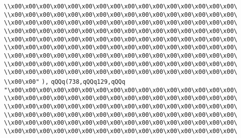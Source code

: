 \verb|\\x00\x00\x00\x00\x00\x00\x00\x00\x00\x00\x00\x00\x00\x00\x00\x00\|\newline
\verb|\\x00\x00\x00\x00\x00\x00\x00\x00\x00\x00\x00\x00\x00\x00\x00\x00\|\newline
\verb|\\x00\x00\x00\x00\x00\x00\x00\x00\x00\x00\x00\x00\x00\x00\x00\x00\|\newline
\verb|\\x00\x00\x00\x00\x00\x00\x00\x00\x00\x00\x00\x00\x00\x00\x00\x00\|\newline
\verb|\\x00\x00\x00\x00\x00\x00\x00\x00\x00\x00\x00\x00\x00\x00\x00\x00\|\newline
\verb|\\x00\x00\x00\x00\x00\x00\x00\x00\x00\x00\x00\x00\x00\x00\x00\x00\|\newline
\verb|\\x00\x00\x00\x00\x00\x00\x00\x00\x00\x00\x00\x00\x00\x00\x00\x00\|\newline
\verb|\\x00\x00\x00\x00\x00\x00\x00\x00\x00\x00\x00\x00\x00\x00\x00\x00\|\newline
\verb|\\x00\x00\x00\x00\x00\x00\x00\x00\x00\x00\x00\x00\x00\x00\x00\x00\|\newline
\verb|\\x00\x00"|\newline
\verb|),|\newline
\verb|qQQq(738,qQQq129,qQQq|\newline
\verb|"\x00\x00\x00\x00\x00\x00\x00\x00\x00\x00\x00\x00\x00\x00\x00\x00\|\newline
\verb|\\x00\x00\x00\x00\x00\x00\x00\x00\x00\x00\x00\x00\x00\x00\x00\x00\|\newline
\verb|\\x00\x00\x00\x00\x00\x00\x00\x00\x00\x00\x00\x00\x00\x00\x00\x00\|\newline
\verb|\\x00\x00\x00\x00\x00\x00\x00\x00\x00\x00\x00\x00\x00\x00\x00\x00\|\newline
\verb|\\x00\x00\x00\x00\x00\x00\x00\x00\x00\x00\x00\x00\x00\x00\x00\x00\|\newline
\verb|\\x00\x00\x00\x00\x00\x00\x00\x00\x00\x00\x00\x00\x00\x00\x00\x00\|\newline
